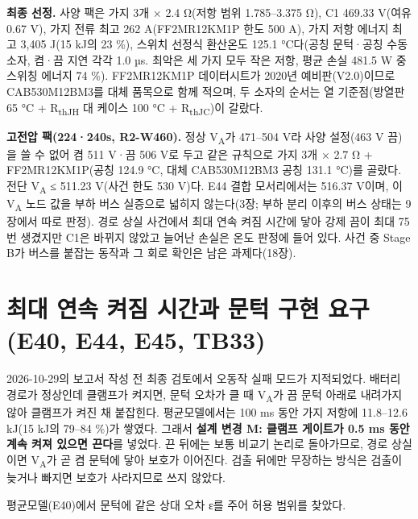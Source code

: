 \textbf{최종 선정.} 사양 팩은 가지 3개 × 2.4 Ω(저항 범위 1.785–3.375 Ω), C1 469.33 V(여유 0.67 V), 가지 전류 최고 262 A(FF2MR12KM1P 한도 500 A), 가지 저항 에너지 최고 3,405 J(15 kJ의 23 \%), 스위치 선정식 환산온도 125.1 °C다(공칭 문턱·공칭 수동소자, 켬·끔 지연 각각 1.0 µs. 최악은 세 가지 모두 작은 저항, 평균 손실 481.5 W 중 스위칭 에너지 74 \%). FF2MR12KM1P 데이터시트가 2020년 예비판(V2.0)이므로 CAB530M12BM3를 대체 품목으로 함께 적으며, 두 소자의 순서는 열 기준점(방열판 65 °C + R\textsubscript{thJH} 대 케이스 100 °C + R\textsubscript{thJC})이 갈랐다.

\textbf{고전압 팩(224·240s, R2-W460).} 정상 V\textsubscript{A}가 471–504 V라 사양 설정(463 V 끔)을 쓸 수 없어 켬 511 V·끔 506 V로 두고 같은 규칙으로 가지 3개 × 2.7 Ω + FF2MR12KM1P(공칭 124.9 °C, 대체 CAB530M12BM3 공칭 131.1 °C)를 골랐다. 전단 V\textsubscript{A} ≤ 511.23 V(사건 한도 530 V)다. E44 결합 모서리에서는 516.37 V이며, 이 V\textsubscript{A} 노드 값을 부하 버스 실증으로 넓히지 않는다(3장; 부하 분리 이후의 버스 상태는 9장에서 따로 판정). 경로 상실 사건에서 최대 연속 켜짐 시간에 닿아 강제 끔이 최대 75번 생겼지만 C1은 바뀌지 않았고 늘어난 손실은 온도 판정에 들어 있다. 사건 중 Stage B가 버스를 붙잡는 동작과 그 회로 확인은 남은 과제다(18장).

\section{최대 연속 켜짐 시간과 문턱 구현 요구(E40, E44, E45, TB33)}

2026-10-29의 보고서 작성 전 최종 검토에서 오동작 실패 모드가 지적되었다. 배터리 경로가 정상인데 클램프가 켜지면, 문턱 오차가 클 때 V\textsubscript{A}가 끔 문턱 아래로 내려가지 않아 클램프가 켜진 채 붙잡힌다. 평균모델에서는 100 ms 동안 가지 저항에 11.8–12.6 kJ(15 kJ의 79–84 \%)가 쌓였다. 그래서 \textbf{설계 변경 M: 클램프 게이트가 0.5 ms 동안 계속 켜져 있으면 끈다}를 넣었다. 끈 뒤에는 보통 비교기 논리로 돌아가므로, 경로 상실이면 V\textsubscript{A}가 곧 켬 문턱에 닿아 보호가 이어진다. 검출 뒤에만 무장하는 방식은 검출이 늦거나 빠지면 보호가 사라지므로 쓰지 않았다.

평균모델(E40)에서 문턱에 같은 상대 오차 ε를 주어 허용 범위를 찾았다.

